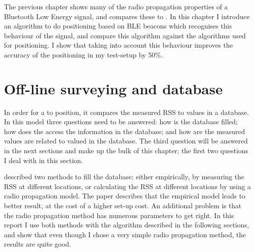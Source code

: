 The previous chapter shows many of the radio propagation properties of a Bluetooth Low Energy signal, and compares these to \wifi.
In this chapter I introduce an algorithm to do positioning based on BLE beacons which recognises this behaviour of the signal, and compare this algorithm against the algorithms used for \wifi positioning.
I show that taking into account this behaviour improves the accuracy of the positioning in my test-setup by 50\%.

\section{Off-line surveying and database}
\label{architecture-database}
In order for a \device to position, it compares the measured RSS to values in a database.
In this model three questions need to be answered: how is the database filled; how does the \device access the information in the database; and how are the measured values are related to valued in the database.
The third question will be answered in the next sections and make up the bulk of this chapter; the first two questions I deal with in this section.

\citet{bahl2000radar} described two methods to fill the database; either empirically, by measuring the RSS at different locations, or calculating the RSS at different locations by using a radio propagation model.
The paper describes that the empirical model leads to better result, at the cost of a higher set-up cost. 
An additional problem is that the radio propagation method has numerous parameters to get right.
In this report I use both methods with the algorithm described in the following sections, and show that even though I chose a very simple radio propagation method, the results are quite good.

